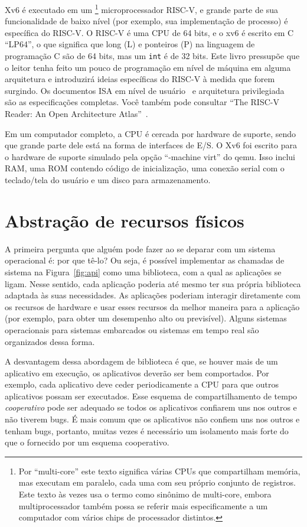 Xv6 é executado em um \footnote{
Por ``multi-core'' este texto significa várias CPUs que compartilham memória,
mas executam em paralelo, cada uma com seu próprio conjunto de registros.
Este texto às vezes usa o termo
  como sinônimo de multi-core,
embora multiprocessador também possa se referir mais especificamente a um computador com
vários chips de processador distintos.} microprocessador RISC-V,
e grande parte de sua funcionalidade de baixo nível
(por exemplo, sua implementação de processo) é específica do
RISC-V. O RISC-V é uma CPU de 64 bits, e o xv6 é escrito em C ``LP64'',
o que significa que long (L) e ponteiros (P) na linguagem de programação C
são de 64 bits, mas um {\tt int} é de 32 bits. Este livro pressupõe que o 
leitor tenha feito um pouco de programação em nível de máquina em alguma 
arquitetura e introduzirá ideias específicas do RISC-V à medida que forem surgindo.
Os documentos ISA em nível de usuário~\cite{riscv:user} e arquitetura
privilegiada~\cite{riscv:priv} são as especificações completas.
Você também pode consultar
``The RISC-V Reader: An Open Architecture Atlas''~\cite{riscv}.

Em um computador completo, a CPU é cercada por hardware de suporte, sendo que
grande parte dele está na forma de interfaces de E/S. O Xv6 foi escrito 
para o hardware de suporte simulado pela opção ``-machine virt'' do qemu. Isso inclui
RAM, uma ROM contendo código de inicialização, uma conexão serial com o teclado/tela
do usuário e um disco para armazenamento.

\section{Abstração de recursos físicos}

A primeira pergunta que alguém pode fazer ao se deparar com um sistema operacional é:
por que tê-lo? Ou seja, é possível implementar as chamadas de sistema na
Figura~\ref{fig:api}
como uma biblioteca, com a qual as aplicações se ligam. Nesse sentido,
cada aplicação poderia até mesmo ter sua própria biblioteca adaptada às suas necessidades.
As aplicações poderiam interagir diretamente com os recursos de hardware
e usar esses recursos da melhor maneira para a aplicação (por exemplo, para obter um desempenho alto ou previsível). Alguns sistemas operacionais para
sistemas embarcados ou sistemas em tempo real são organizados dessa forma.

A desvantagem dessa abordagem de biblioteca é que, se houver mais de um aplicativo
em execução, os aplicativos deverão ser bem comportados.
Por exemplo, cada aplicativo deve ceder periodicamente a CPU
para que outros aplicativos possam ser executados.
Esse esquema de compartilhamento de tempo 
\textit{cooperativo} 
pode ser adequado se todos os aplicativos confiarem uns nos outros e não tiverem bugs. É mais comum que os aplicativos não confiem uns nos outros e tenham bugs, portanto, muitas vezes é necessário um isolamento mais forte do que o fornecido por um esquema cooperativo.

